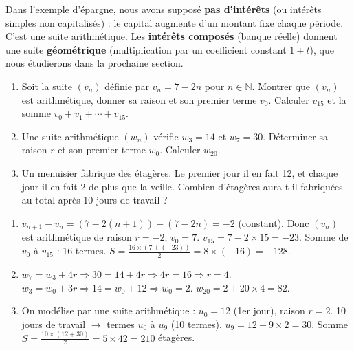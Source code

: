 \documentclass[11pt]{article}
\begin{document}
\begin{savaistu}
Dans l'exemple d'épargne, nous avons supposé \textbf{pas d'intérêts} (ou intérêts simples non capitalisés) : le capital augmente d'un montant fixe chaque période. C'est une suite arithmétique. Les \textbf{intérêts composés} (banque réelle) donnent une suite \textbf{géométrique} (multiplication par un coefficient constant $1+t$), que nous étudierons dans la prochaine section.
\end{savaistu}

\begin{exercice}[Entraînement]
\begin{enumerate}
\item Soit la suite $(v_n)$ définie par $v_n = 7 - 2n$ pour $n \in \mathbb{N}$. Montrer que $(v_n)$ est arithmétique, donner sa raison et son premier terme $v_0$. Calculer $v_{15}$ et la somme $v_0 + v_1 + \cdots + v_{15}$.
\item Une suite arithmétique $(w_n)$ vérifie $w_3 = 14$ et $w_7 = 30$. Déterminer sa raison $r$ et son premier terme $w_0$. Calculer $w_{20}$.
\item Un menuisier fabrique des étagères. Le premier jour il en fait 12, et chaque jour il en fait 2 de plus que la veille. Combien d'étagères aura-t-il fabriquées au total après 10 jours de travail ?
\end{enumerate}
\end{exercice}

\begin{corrige}[Exercices]
\begin{enumerate}
\item $v_{n+1}-v_n = (7-2(n+1)) - (7-2n) = -2$ (constant). Donc $(v_n)$ est arithmétique de raison $r=-2$, $v_0=7$.
$v_{15} = 7 - 2\times15 = -23$.
Somme de $v_0$ à $v_{15}$ : 16 termes. $S = \frac{16 \times (7 + (-23))}{2} = 8 \times (-16) = -128$.
\item $w_7 = w_3 + 4r \Rightarrow 30 = 14 + 4r \Rightarrow 4r = 16 \Rightarrow r = 4$.
$w_3 = w_0 + 3r \Rightarrow 14 = w_0 + 12 \Rightarrow w_0 = 2$.
$w_{20} = 2 + 20\times4 = 82$.
\item On modélise par une suite arithmétique : $u_0 = 12$ (1er jour), raison $r = 2$.
10 jours de travail $\rightarrow$ termes $u_0$ à $u_9$ (10 termes).
$u_9 = 12 + 9\times2 = 30$.
Somme $S = \frac{10 \times (12 + 30)}{2} = 5 \times 42 = 210$ étagères.
\end{enumerate}
\end{corrige}
\end{document}
